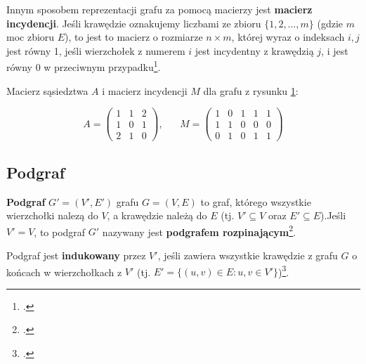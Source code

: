 Innym sposobem reprezentacji grafu za pomocą macierzy jest \textbf{macierz incydencji}. Jeśli krawędzie oznakujemy liczbami ze zbioru $\{1,2,\ldots,m\}$ (gdzie $m$ moc zbioru $E$), to jest to macierz o rozmiarze $n \times m$, której wyraz o indeksach $i,j$ jest równy 1, jeśli wierzchołek z numerem $i$ jest incydentny z krawędzią $j$, i jest równy 0 w przeciwnym przypadku\footcite[27]{ross}.

\begin{figure}[H]
\centering
\caption{}\label{fig:graph-edge-labeled}
\end{figure}

Macierz sąsiedztwa $A$ i macierz incydencji $M$ dla grafu z rysunku \ref{fig:graph-edge-labeled}:

\[A = 
 \begin{pmatrix}
  1 & 1 & 2 \\
  1 & 0 & 1 \\
  2 & 1 & 0 
 \end{pmatrix}, \hspace{20pt}
 M = 
 \begin{pmatrix}
  1 & 0 & 1 & 1 & 1 \\
  1 & 1 & 0 & 0 & 0 \\
  0 & 1 & 0 & 1 & 1 
 \end{pmatrix}
\]

\subsection*{Podgraf}
\textbf{Podgraf} $G'=(V',E')$ grafu $G=(V,E)$ to graf, którego wszystkie wierzchołki nalezą do $V$, a krawędzie należą do $E$ (tj. $V' \subseteq V$ oraz $E' \subseteq E$).Jeśli $V' = V$, to podgraf $G'$ nazywany jest \textbf{podgrafem rozpinającym}\footcite[229]{banachowski}. 

Podgraf jest \textbf{indukowany} przez $V'$, jeśli zawiera wszystkie krawędzie z grafu $G$ o końcach w wierzchołkach z $V'$ (tj. $E'=\{(u,v) \in E: u,v \in V' \}$)\footcite[1195]{cormen}.


